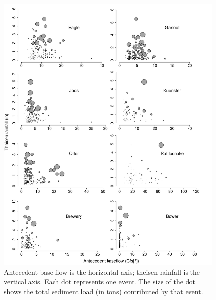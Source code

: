\documentclass[10pt]{article}
\makeatletter
\def\maxwidth{ %
  \ifdim\Gin@nat@width>\linewidth
    \linewidth
  \else
    \Gin@nat@width
  \fi
}
\newenvironment{knitrout}{}{} %
\makeatother
\begin{document}
\begin{figure}
    \begin{center}
\begin{knitrout}
\color{fgcolor}\includegraphics[width=\maxwidth]{figure/figure4} 
\end{knitrout}

    \end{center}
    \caption{Antecedent base flow is the horizontal axis; theisen rainfall is the vertical axis. Each dot represents one event. The size of the dot shows the total sediment load (in tons) contributed by that event. \label{sed_bubbles}}
\end{figure}
\end{document}
